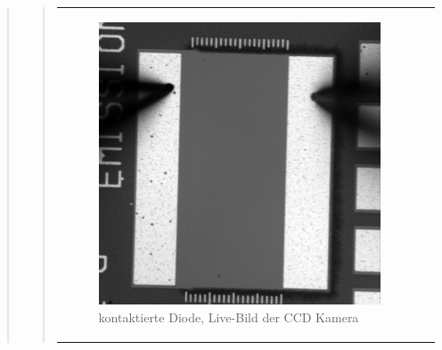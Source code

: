 \begin{quote}
\begin{quote}
         \begin{center}
                \begin{tabular}{ll}

                \hspace{-10em}
                    \begin{minipage}{0.6\textwidth}

                        \begin{figure}[H]
                            \label{fig:rtaretewtrwer}
                            \includegraphics[scale=0.25, trim = 0cm 0cm 0cm
                            0cm,
                            clip]{./Emissionsbilder/drei/nach_Kontaktierung.jpg}
                            \caption{kontaktierte Diode, Live-Bild der CCD
                            Kamera}
                        \end{figure}

                    \end{minipage}
                    \begin{minipage}{0.6\textwidth}


\end{minipage}
\end{tabular}
\end{center}
\end{quote}
\end{quote}
